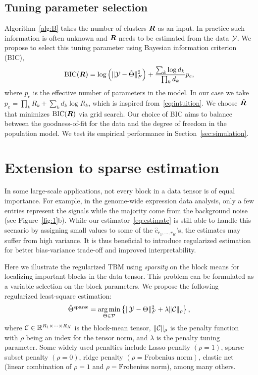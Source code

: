 \documentclass{article}
\begin{document}
\subsection{Tuning parameter selection}\label{sec:tuning}
\vspace{-.1cm}
Algorithm~\ref{alg:B} takes the number of clusters $\bm{R}$ as an input. In practice such information is often unknown and $\bm{R}$ needs to be estimated from the data $\mathcal{Y}$. We propose to select this tuning parameter using Bayesian information criterion (BIC), 
\begin{equation}\label{eq:BIC}
\text{BIC}(\bm{R}) =  \log\left(\lVert\mathcal{Y}-\hat \Theta\rVert_F^2\right)+{ \sum_k \log d_k \over \prod_k d_k}p_e,
\end{equation}
where $p_e$ is the effective number of parameters in the model. In our case we take $p_e=\prod_k R_k+\sum_k d_k\log R_k$, which is inspired from~\eqref{eq:intuition}. We choose $\hat {\bm{R}}$ that minimizes $\text{BIC}(\bm{R})$ via grid search. Our choice of BIC aims to balance between the goodness-of-fit for the data and the degree of freedom in the population model. We test its empirical performance in Section~\ref{sec:simulation}.  

\vspace{-.1cm}
\section{Extension to sparse estimation}
\vspace{-.2cm}
In some large-scale applications, not every block in a data tensor is of equal importance. For example, in the genome-wide expression data analysis, only a few entries represent the signals while the majority come from the background noise (see Figure~\ref{fig:1}b). %
While our estimator~\eqref{eq:estimate} is still able to handle this scenario by assigning small values to some of the $\hat c_{r_1,\ldots,r_K}$'s, the estimates may suffer from high variance. It is thus beneficial to introduce regularized estimation for better bias-variance trade-off and improved interpretability. 

Here we illustrate the regularized TBM using \emph{sparsity} on the block means for localizing important blocks in the data tensor. This problem can be formulated as a variable selection on the block parameters. We propose the following regularized least-square estimation:
\[
\hat \Theta^{\text{sparse}}=\operatorname*{arg\,min}_{\Theta\in \mathcal{P}}\left\{\lVert\mathcal{Y}-\Theta\rVert_F^2+\lambda \lVert\mathcal{C}\rVert_\rho
\right\},
\]
where $\mathcal{C}\in\mathbb{R}^{R_1\times \cdots\times R_K}$ is the block-mean tensor, $\lVert\mathcal{C}\rVert_\rho$ is the penalty function with $\rho$ being an index for the tensor norm, and $\lambda$ is the penalty tuning parameter. Some widely used penalties include Lasso penalty $(\rho=1)$, sparse subset penalty $(\rho=0)$, ridge penalty $(\rho=\text{Frobenius norm})$, elastic net (linear combination of $\rho=1$ and $\rho=\text{Frobenius norm}$), among many others. 
\end{document}
